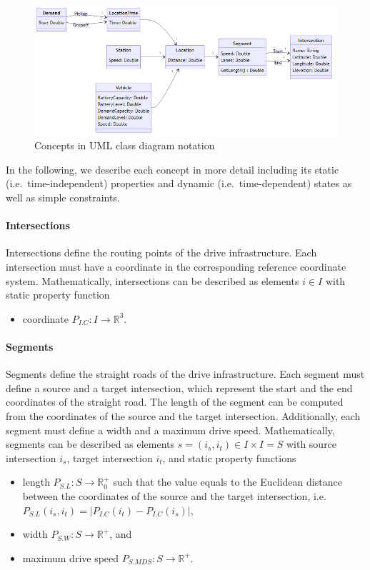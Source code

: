 \documentclass{article}
\begin{document}
    \begin{figure}[htbp]
        \centering
        \includegraphics[width=\textwidth]{../../diagrams/model/classes-v0.png}
        \caption{Concepts in UML class diagram notation}
        \label{fig:concepts}
    \end{figure}

    In the following, we describe each concept in more detail including its static (i.e.\ time-independent) properties and dynamic (i.e.\ time-dependent) states as well as simple constraints.

    \paragraph{Intersections}
    Intersections define the routing points of the drive infrastructure.
    Each intersection must have a coordinate in the corresponding reference coordinate system.
    Mathematically, intersections can be described as elements $i \in I$ with static property function
    \begin{itemize}
        \item coordinate $P_{I.C}: I \rightarrow \mathbb{R}^3$.
    \end{itemize}

    \paragraph{Segments}
    Segments define the straight roads of the drive infrastructure.
    Each segment must define a source and a target intersection, which represent the start and the end coordinates of the straight road.
    The length of the segment can be computed from the coordinates of the source and the target intersection.
    Additionally, each segment must define a width and a maximum drive speed.
    Mathematically, segments can be described as elements $s = (i_s, i_t) \in I \times I = S$ with source intersection $i_s$, target intersection $i_t$, and static property functions
    \begin{itemize}
        \item length $P_{S.L}: S \rightarrow \mathbb{R}_0^+$ such that the value equals to the Euclidean distance between the coordinates of the source and the target intersection, i.e.\ $P_{S.L}(i_s, i_t) = |P_{I.C}(i_t) - P_{I.C}(i_s)|$,
        \item width $P_{S.W}: S \rightarrow \mathbb{R}^+$, and
        \item maximum drive speed $P_{S.MDS}: S \rightarrow \mathbb{R}^+$.
    \end{itemize}
\end{document}
